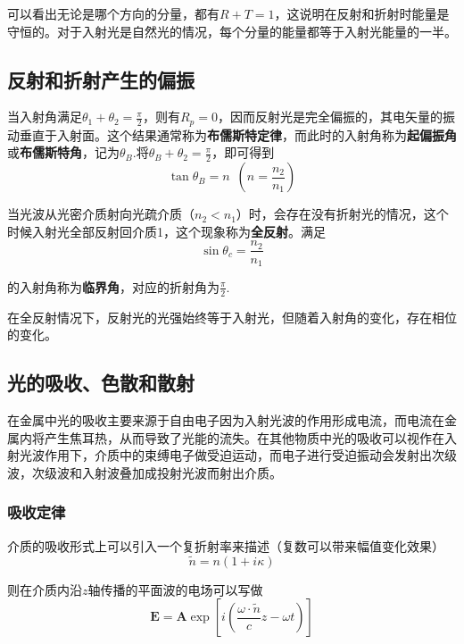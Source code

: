 \documentclass[UTF8]{ctexart}
\begin{document}
	可以看出无论是哪个方向的分量，都有$ R+T=1 $，这说明在反射和折射时能量是守恒的。对于入射光是自然光的情况，每个分量的能量都等于入射光能量的一半。
	
	\subsection{反射和折射产生的偏振}
	当入射角满足$ \theta_{1} + \theta_{2}=\frac{\pi}{2} $，则有$ R_{p}=0 $，因而反射光是完全偏振的，其电矢量的振动垂直于入射面。这个结果通常称为\textbf{布儒斯特定律}，而此时的入射角称为\textbf{起偏振角}或\textbf{布儒斯特角}，记为$ \theta_{B} $.将$ \theta_{B}+\theta_{2}=\frac{\pi}{2} $，即可得到
	\begin{equation}
		\tan \theta_{B} = n \enspace (n=\frac{n_{2}}{n_{1}})
	\end{equation}
	
	当光波从光密介质射向光疏介质（$ n_{2}<n_{1} $）时，会存在没有折射光的情况，这个时候入射光全部反射回介质1，这个现象称为\textbf{全反射}。满足
	\begin{equation}
		\sin \theta_{c} = \frac{n_{2}}{n_{1}}
	\end{equation}
	
\noindent 的入射角称为\textbf{临界角}，对应的折射角为$ \frac{\pi}{2} $.

	在全反射情况下，反射光的光强始终等于入射光，但随着入射角的变化，存在相位的变化。
	
	\subsection{光的吸收、色散和散射}
	在金属中光的吸收主要来源于自由电子因为入射光波的作用形成电流，而电流在金属内将产生焦耳热，从而导致了光能的流失。在其他物质中光的吸收可以视作在入射光波作用下，介质中的束缚电子做受迫运动，而电子进行受迫振动会发射出次级波，次级波和入射波叠加成投射光波而射出介质。
	
	\subsubsection{吸收定律}
	介质的吸收形式上可以引入一个复折射率来描述（复数可以带来幅值变化效果）
	\begin{equation}
		\tilde{n} = n(1+i\kappa)
	\end{equation}
	
\noindent 则在介质内沿$ z $轴传播的平面波的电场可以写做
\begin{equation}
	\boldsymbol{E} = \boldsymbol{A} \exp \left[i \left(\frac{\omega \cdot \tilde{n}}{c} z - \omega t\right)\right]
\end{equation}
\end{document}
